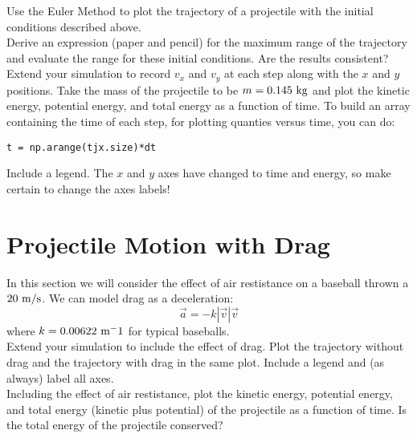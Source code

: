 \plot Use the Euler Method to plot the trajectory of a projectile with the initial conditions described above.\\

\plot Derive an expression (paper and pencil) for the maximum range of the trajectory and evaluate the range for these initial conditions.  Are the results consistent?\\

\plot Extend your simulation to record $v_x$ and $v_y$ at each step
along with the $x$ and $y$ positions.  Take the mass of the projectile
to be $m=0.145~\rm kg$ and plot the kinetic energy, potential energy,
and total energy as a function of time.  To build an array containing
the time of each step, for plotting quanties versus time, you can do:
\begin{verbatim}
t = np.arange(tjx.size)*dt
\end{verbatim}
Include a legend. The $x$ and $y$ axes have changed to time and energy, so make certain to change the axes labels!\\

\section{Projectile Motion with Drag}

In this section we will consider the effect of air restistance on a
baseball thrown a $20~\rm m/s$.  We can model drag as a deceleration:
\begin{displaymath}
\vec{a} = -k |\vec{v}| \vec{v}
\end{displaymath}
where $k=0.00622~\rm m^-1$ for typical baseballs.\\

\plot Extend your simulation to include the effect of drag.  Plot the
trajectory without drag and the trajectory with drag in the same plot.
Include a legend and (as always) label all axes.\\

\plot Including the effect of air restistance, plot the kinetic
energy, potential energy, and total energy (kinetic plus potential) of
the projectile as a function of time.  Is the total energy of the
projectile conserved?\\

